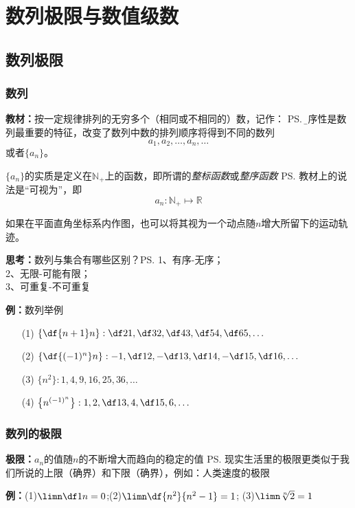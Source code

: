 \setcounter{chapter}{1}

\chapter{数列极限与数值级数}

\section{数列极限}

\subsection{数列}

{\bf 教材：}按一定规律排列的无穷多个（相同或不相同的）数，记作：
\ps{\b 有序性是数列最重要的特征，改变了数列中数的排列顺序将得到不同的数列}
$$a_1,a_2,\ldots,a_n,\ldots$$
或者$\{a_n\}$。

$\{a_n\}$的实质是定义在$\mathbb{N}_+$上的函数，即所谓的{\it 整标函数}或{\it 整序函数}
\ps{教材上的说法是“可视为”}，即
$$a_n:\mathbb{N}_+\mapsto\mathbb{R}$$

如果在平面直角坐标系内作图，也可以将其视为一个动点随$n$增大所留下的运动轨迹。

{\bf 思考：}数列与集合有哪些区别？\ps{1、有序-无序；\\ 2、无限-可能有限；\\ 3、可重复-不可重复}

{\bf 例：}数列举例

\begin{enumerate}[(1)]
  \setlength{\itemindent}{1cm}
  \item[(1)] $\left\{\df{n+1}n\right\}:\df 21,\df 32,\df43,\df54,\df65,\ldots$
  \item[(2)] $\left\{\df{(-1)^n}n\right\}:-1,\df12,-\df13,\df14,-\df15,\df16,\ldots$
  \item[(3)] $\{n^2\}:1,4,9,16,25,36,\ldots$
  \item[(4)] $\left\{n^{(-1)^n}\right\}:1,2,\df13,4,\df15,6,\ldots$
\end{enumerate}

\subsection{数列的极限}

{\bf 极限：}$a_n$的值随$n$的不断增大而趋向的稳定的值
\ps{现实生活里的极限更类似于我们所说的上限（确界）和下限（确界），例如：人类速度的极限} 

{\bf 例：}(1)$\limn\df1n=0$;\quad(2)$\limn\df{n^2}{n^2-1}=1$;
\quad(3)$\limn\sqrt[n]2=1$

